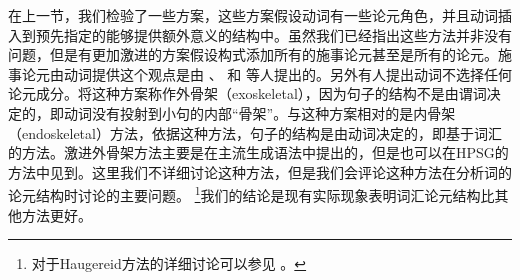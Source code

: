 在上一节，我们检验了一些方案，这些方案假设动词有一些论元角色，并且动词插入到预先指定的能够提供额外意义的结构中。虽然我们已经指出这些方法并非没有问题，但是有更加激进的方案假设构式添加所有的施事论元甚至是所有的论元。施事论元由动词提供这个观点是由 \citet{Marantz84a, Marantz97a}、 \citet{Kratzer96a}和 \citet{Embick2004a}等人提出的。另外有人提出动词不选择任何论元成分。\citet{Borer2003a-u}将这种方案称作外骨架（exoskeletal），因为句子的结构不是由谓词决定的，即动词没有投射到小句的内部“骨架”。与这种方案相对的是内骨架（endoskeletal）方法，依据这种方法，句子的结构是由动词决定的，即基于词汇的方法。激进外骨架方法主要是在主流生成语法\citep{Borer94a-u,Borer2003a-u,Borer2005a-u,Schein93a-u,HK97a-u,Lohndal2012a}中提出的，但是也可以在HPSG的方法中见到\citep{Haugereid2009a}。这里我们不详细讨论这种方法，但是我们会评论这种方法在分析词的论元结构时讨论的主要问题。
\footnote{%
对于Haugereid方法的详细讨论可以参见 。%
}我们的结论是现有实际现象表明词汇论元结构比其他方法更好。 

